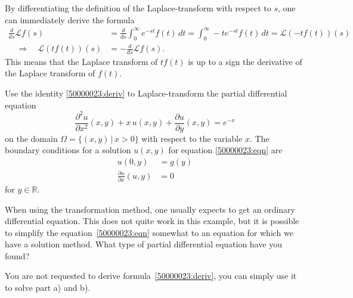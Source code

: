 By differentiating the definition of the Laplace-transform with respect to $s$,
one can immediately derive the formula
\begin{align*}
\frac{d}{ds}\mathscr{L}f(s)
&=
\frac{d}{ds}\int_0^\infty e^{-st} f(t)\,dt
=
\int_0^\infty -t e^{-st} f(t)\,dt
=
\mathscr{L}(-tf(t)) (s)
\\
\quad\Rightarrow\quad
\mathscr{L}(tf(t)) (s) &= -\frac{d}{ds}\mathscr{L}f(s).
\label{50000023:deriv}
\end{align*}
This means that the Laplace transform of $tf(t)$ is up to a sign the
derivative of the Laplace transform of $f(t)$.
\begin{teilaufgaben}
\item
Use the identity \eqref{50000023:deriv} to Laplace-transform the partial
differential equation
\begin{equation}
\frac{\partial^2u}{\partial x^2}(x,y)
+x\,u(x,y)
+\frac{\partial u}{\partial y}(x,y) = e^{-x}
\label{50000023:eqn}
\end{equation}
on the domain $\Omega=\{(x,y)\,|\,x>0\}$ with respect to the variable $x$.
The boundary conditions for a solution $u(x,y)$ for equation
\eqref{50000023:eqn} are
\begin{align*}
u(0,y) &= g(y)\\
\frac{\partial u}{\partial x}(u,y) &= 0
\end{align*}
for $y\in\mathbb R$.
\item
When using the transformation method, one usually expects to get an
ordinary differential equation.
This does not quite work in this example, but it is possible
to simplify the equation~\eqref{50000023:eqn}
somewhat to an equation for which we have a solution method.
What type of partial differential equation have you found?
\end{teilaufgaben}

\begin{hinweis}
You are not requested to derive formula~\eqref{50000023:deriv}, you can
simply use it to solve part a) and b).
\end{hinweis}


